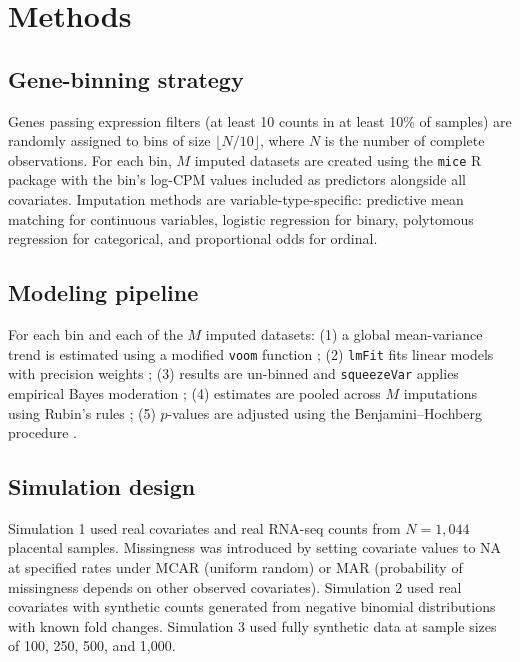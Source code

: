 \documentclass[11pt]{article}
\begin{document}
\section{Methods}

\subsection{Gene-binning strategy}

Genes passing expression filters (at least 10 counts in at least 10\% of samples) are randomly assigned to bins of size $\lfloor N / 10 \rfloor$, where $N$ is the number of complete observations. For each bin, $M$ imputed datasets are created using the \texttt{mice} R package \citep{vanbuuren2011mice} with the bin's log-CPM values included as predictors alongside all covariates. Imputation methods are variable-type-specific: predictive mean matching for continuous variables, logistic regression for binary, polytomous regression for categorical, and proportional odds for ordinal.

\subsection{Modeling pipeline}

For each bin and each of the $M$ imputed datasets: (1) a global mean-variance trend is estimated using a modified \texttt{voom} function \citep{law2014voom}; (2) \texttt{lmFit} fits linear models with precision weights \citep{ritchie2015limma}; (3) results are un-binned and \texttt{squeezeVar} applies empirical Bayes moderation \citep{smyth2004linear}; (4) estimates are pooled across $M$ imputations using Rubin's rules \citep{rubin1987multiple}; (5) $p$-values are adjusted using the Benjamini--Hochberg procedure \citep{benjamini1995controlling}.

\subsection{Simulation design}

Simulation 1 used real covariates and real RNA-seq counts from $N = 1{,}044$ placental samples. Missingness was introduced by setting covariate values to NA at specified rates under MCAR (uniform random) or MAR (probability of missingness depends on other observed covariates). Simulation 2 used real covariates with synthetic counts generated from negative binomial distributions with known fold changes. Simulation 3 used fully synthetic data at sample sizes of 100, 250, 500, and 1{,}000.
\end{document}
